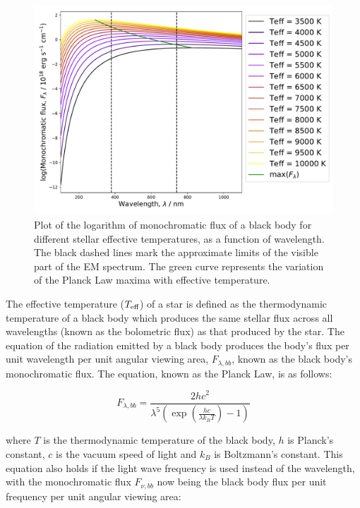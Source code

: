 \documentclass[12pt, a4paper]{report}
\begin{document}
\begin{figure}[h!]
\begin{center}
\includegraphics[width=1.0\textwidth]{blackbody_teff_logF_illustration.pdf}
\caption{Plot of the logarithm of monochromatic flux of a black body for different stellar effective temperatures, as a function of wavelength. The black dashed lines mark the approximate limits of the visible part of the EM spectrum. The green curve represents the variation of the Planck Law maxima with effective temperature.}
\label{planck_curve}
\end{center}
\end{figure}

The effective temperature ($T_{\textnormal{eff}}$) of a star is defined as the thermodynamic temperature of a black body which produces the same stellar flux across all wavelengths (known as the bolometric flux) as that produced by the star. The equation of the radiation emitted by a black body produces the body's flux per unit wavelength per unit angular viewing area, $F_{\lambda,bb}$, known as the black body's monochromatic flux. The equation, known as the Planck Law, is as follows:


\begin{equation}
F_{\lambda,bb} = \frac{2hc^{2}}{\lambda^{5}\left(\exp\left({\frac{hc}{\lambda k_{B}T}}\right) - 1\right)}
\label{planck_bb}
\end{equation} 

where $T$ is the thermodynamic temperature of the black body, $h$ is Planck's constant, $c$ is the vacuum speed of light and $k_{B}$ is Boltzmann's constant. This equation also holds if the light wave frequency is used instead of the wavelength, with the monochromatic flux $F_{\nu,bb}$ now being the black body flux per unit frequency per unit angular viewing area:
\end{document}
